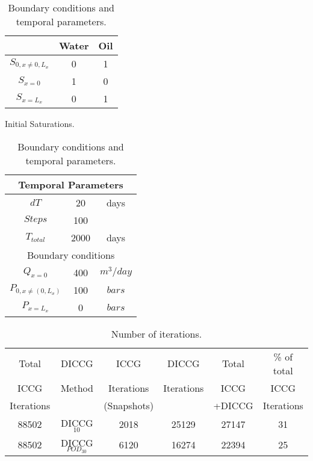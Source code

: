 \documentclass[12pt]{article}
\begin{document}
{\begin{table}[!ht]
\begin{minipage}{.4\textwidth}
\begin{tabular}{ |c|c|c|}
\hline
&Water&Oil\\
\hline
$S_{0,x\neq 0, L_x}$&0&1\\
$S_{x=0}$&1&0\\
$S_{x=L_x}$&0&1\\
\hline

\end{tabular}
\caption{Initial Saturations.}\label{table:satspe_b}
\end{minipage}%
\hspace{1cm}
\begin{minipage}{.4\textwidth}
\centering
\begin{tabular}{ |c|c|c|} 
\hline
\multicolumn{3}{|c|}{Temporal Parameters}\\
\hline
$dT$& 20&days\\  
$Steps$& 100&\\   
$T_{total}$&     2000& days\\
\hline
\multicolumn{3}{|c|}{Boundary conditions}\\
\hline
$Q_{x=0}$&400&$m^3/day$\\
$P_{0,x\neq (0, L_x)}$&100&$bars$\\
$P_{x=L_x}$&0&$bars$\\
\hline
\end{tabular}\caption{Boundary conditions and temporal parameters.}
\label{table:bcspe_b}
\end{minipage}
\end{table} 


\begin{table}[!ht]\centering
\begin{minipage}{0.9\textwidth}
 \centering
\begin{tabular}{ ||c|c|c|c|c|c||} 
 \hline
Total& DICCG & ICCG&DICCG &Total&\% of total\\ 
      ICCG       & Method & Iterations & Iterations&ICCG& ICCG\\ 
 Iterations&        &  (Snapshots)   & &+DICCG&Iterations \\
\hline  
88502& DICCG$_{10}$&2018&25129&27147&31 \\ 
\hline  
88502& DICCG$_{POD_{30}}$&6120&16274&22394&25 \\ 
\hline   
\end{tabular} 
\caption{Number of iterations. }\label{table:itspe_b} 
\end{minipage}  
\end{table}  




}
\end{document}
